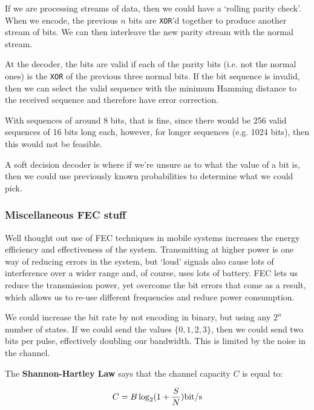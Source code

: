 If we are processing streams of data, then we could have a `rolling parity
check'. When we encode, the previous $n$ bits are \texttt{XOR}'d together to
produce another stream of bits. We can then interleave the new parity stream
with the normal stream.

At the decoder, the bits are valid if each of the parity bits (i.e. not the
normal ones) is the \texttt{XOR} of the previous three normal bits. If the bit
sequence is invalid, then we can select the valid sequence with the minimum
Hamming distance to the received sequence and therefore have error correction.

With sequences of around 8 bits, that is fine, since there would be 256 valid
sequences of 16 bits long each, however, for longer sequences (e.g. 1024 bits),
then this would not be feasible.


A soft decision decoder is where if we're unsure as to what the value of a bit
is, then we could use previously known probabilities to determine what we could
pick.


\subsubsection{Miscellaneous FEC stuff}

Well thought out use of FEC techniques in mobile systems increases the energy
efficiency and effectiveness of the system. Transmitting at higher power is one
way of reducing errors in the system, but `loud' signals also cause lots of
interference over a wider range and, of course, uses lots of battery. FEC lets
us reduce the transmission power, yet overcome the bit errors that come as a
result, which allows us to re-use different frequencies and reduce power
consumption.

We could increase the bit rate by not encoding in binary, but using any $2^n$
number of states. If we could send the values $\{0,1,2,3\}$, then we could send
two bits per pulse, effectively doubling our bandwidth. This is limited by the
noise in the channel.

The \textbf{Shannon-Hartley Law} says that the channel capacity $C$ is equal to:

\[
  C = B \log_2(1 + \frac{S}{N}) \si{\bit\per\second}
\]

